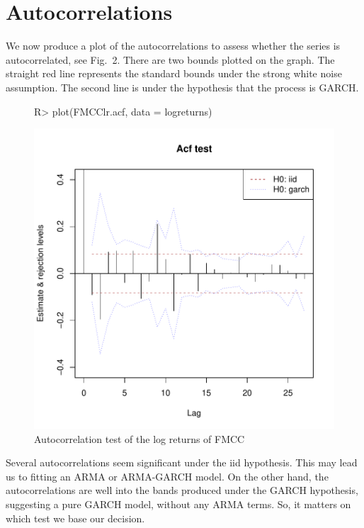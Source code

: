 \documentclass[article,nojss]{jss}
\begin{document}
\section{Autocorrelations}
\label{sec:autocorrelations}

We now produce a plot of the autocorrelations to assess whether the series is autocorrelated,
see Fig.~2. There are two bounds plotted on the graph. The straight red line represents the
standard bounds under the strong white noise assumption. The second line is under the
hypothesis that the process is GARCH.
\begin{figure}[ht]
  \centering
\begin{Schunk}
\begin{Sinput}
R> plot(FMCClr.acf, data = logreturns)
\end{Sinput}
\end{Schunk}
\includegraphics{garch_tests_example-006}
\caption{Autocorrelation test of the log returns of FMCC}
\end{figure}

Several autocorrelations seem significant under the iid hypothesis.
This may lead us to fitting an ARMA or ARMA-GARCH model.
On the other hand, the autocorrelations are well into the bands produced under the GARCH
hypothesis, suggesting a pure GARCH model,
without any ARMA terms.
So, it matters on which test we base our decision.
\end{document}
